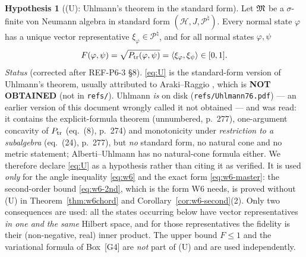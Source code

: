 \documentclass[11pt]{article}
\theoremstyle{definition}\newtheorem{example}[theorem]{Example}
\newtheorem{hypothesis}[theorem]{Hypothesis}
\begin{document}
\begin{hypothesis}[(U): Uhlmann's theorem in the standard form]\label{hyp:U}
Let $\mathfrak M$ be a $\sigma$-finite von Neumann algebra in standard form
$(\mathcal H,J,\mathcal P^\natural)$.  Every normal state $\varphi$ has a unique vector
representative $\xi_\varphi\in\mathcal P^\natural$, and for all normal states $\varphi,\psi$
\begin{equation}\label{eq:U}
 F(\varphi,\psi)=\sqrt{P_{\rm tr}(\varphi,\psi)}=\langle\xi_\varphi,\xi_\psi\rangle\in[0,1].
\end{equation}
\emph{Status} (corrected after REF-P6-3 \S8).  \eqref{eq:U} is the standard-form version of
Uhlmann's theorem, usually attributed to Araki--Raggio \cite{AR82}, which is \textbf{NOT
OBTAINED} (not in \texttt{refs/}).  Uhlmann \cite{Uhl76} \emph{is} on disk
(\texttt{refs/Uhlmann76.pdf}) --- an earlier version of this document wrongly called it not
obtained --- and was read: it contains the explicit-formula theorem (unnumbered, p.~277),
one-argument concavity of $P_{\rm tr}$ (eq.~(8), p.~274) and monotonicity under
\emph{restriction to a subalgebra} (eq.~(24), p.~277), but \emph{no} standard form, no natural
cone and no metric statement; Alberti--Uhlmann \cite{AU02} has no natural-cone formula either.
We therefore declare \eqref{eq:U} as a hypothesis rather than citing it as verified.  It is used
\emph{only} for the angle inequality \eqref{eq:w6} and the exact form \eqref{eq:w6-master}: the
second-order bound \eqref{eq:w6-2nd}, which is the form W6 needs, is proved without (U) in
Theorem~\ref{thm:w6chord} and Corollary~\ref{cor:w6-second}(2).  Only two consequences are
used: all the states occurring below have vector representatives \emph{in one and the same}
Hilbert space, and for those representatives the fidelity is their (non-negative, real) inner
product.  The upper bound $F\le1$ and the variational formula of Box~[G4] are \emph{not}
part of (U) and are used independently.
\end{hypothesis}
\end{document}
